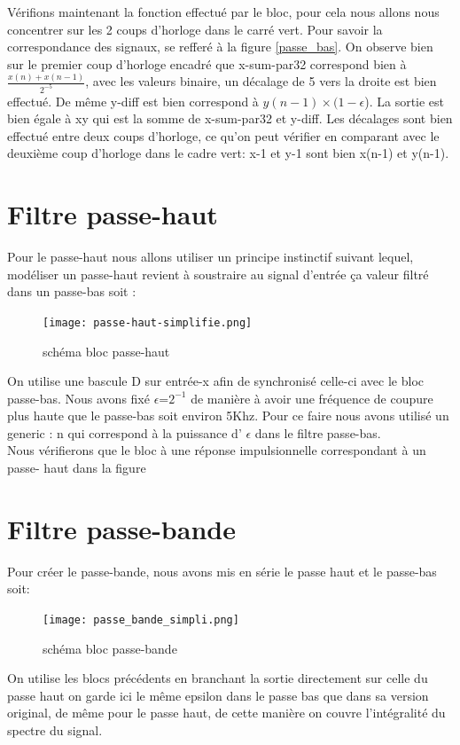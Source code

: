 \documentclass[hidelinks]{article}
\begin{document}
    Vérifions maintenant la fonction effectué par le bloc, pour cela nous allons nous concentrer sur les 2 coups d'horloge dans le carré vert. Pour savoir la correspondance des signaux, se refferé à la figure \ref{passe_bas}.
    On observe bien sur le premier coup d'horloge encadré que x-sum-par32 correspond bien à ${\frac{x(n)+x(n-1)}{2^{-5}}}$, avec les valeurs binaire, un décalage de 5 vers la droite est bien effectué. De même y-diff est bien correspond à $y(n-1)\times(1-\epsilon$). La sortie est bien égale à xy qui est la somme de x-sum-par32 et y-diff. Les décalages sont bien effectué entre deux coups d'horloge, ce qu'on peut vérifier en comparant avec le deuxième coup d'horloge dans le cadre vert: x-1 et y-1 sont bien x(n-1) et y(n-1).
	
    \section{Filtre passe-haut}
    Pour le passe-haut nous allons utiliser un principe instinctif suivant lequel, modéliser un passe-haut revient à soustraire au signal d'entrée ça valeur filtré dans un passe-bas soit :
    \begin{figure}[h]
    	\centering
    	\texttt{[image: passe-haut-simplifie.png]}
    	\caption{schéma bloc passe-haut}
    \end{figure}

	On utilise une bascule D sur entrée-x afin de synchronisé celle-ci avec le bloc passe-bas. Nous avons fixé $\epsilon$=$2^{-1}$ de manière à avoir une fréquence de coupure plus haute que le passe-bas soit environ 5Khz. Pour ce faire nous avons utilisé un generic : n qui correspond à la puissance d'  $\epsilon$ dans le filtre passe-bas.  \\
	Nous vérifierons que le bloc à une réponse impulsionnelle correspondant à un passe- haut dans la figure \cite{sim_dsp}
	\newpage 

    \section{Filtre passe-bande}
	Pour créer le passe-bande, nous avons mis en série le passe haut et le passe-bas soit:
	\begin{figure}[h]
		\centering
		\texttt{[image: passe\_bande\_simpli.png]}
		\caption{schéma bloc passe-bande}
	\end{figure}

	On utilise les blocs précédents en branchant la sortie directement sur celle du passe haut
	on garde ici le même epsilon dans le passe bas que dans sa version original, de même pour le passe haut, de cette manière on couvre l'intégralité du spectre du signal.
\end{document}
